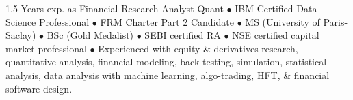 \par{\vspace*{-15px}
1.5 Years exp. as Financial Research Analyst {Quant} $\bullet$ IBM Certified Data Science Professional $\bullet$ FRM Charter Part 2 Candidate $\bullet$ MS (University of Paris-Saclay) $\bullet$ BSc (Gold Medalist) $\bullet$ SEBI certified RA $\bullet$ NSE certified capital market professional $\bullet$ Experienced with equity \& derivatives research, quantitative analysis, financial modeling, back-testing, simulation, statistical analysis, data analysis with machine learning, algo-trading, HFT, \& financial software design.}